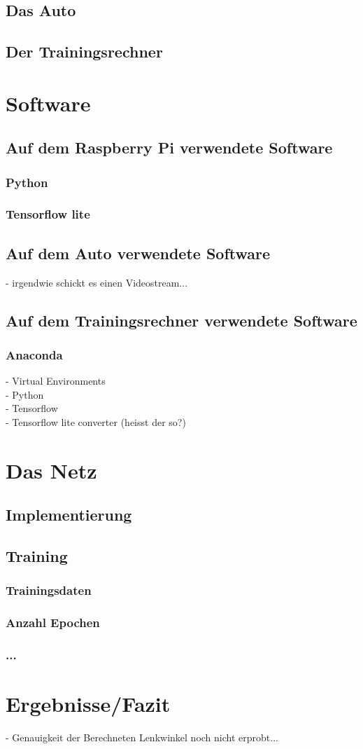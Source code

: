 \documentclass[a4paper, 12pt]{scrartcl}
\begin{document}
		
		\subsection{Das Auto}
		\subsection{Der Trainingsrechner}
	
	\section{Software}
		\subsection{Auf dem Raspberry Pi verwendete Software}
			\subsubsection{Python}
			\subsubsection{Tensorflow lite}
		\subsection{Auf dem Auto verwendete Software}
		- irgendwie schickt es einen Videostream...
		\subsection{Auf dem Trainingsrechner verwendete Software}
			\subsubsection{Anaconda}
			- Virtual Environments \\
			- Python \\
			- Tensorflow \\
			- Tensorflow lite converter (heisst der so?) \\
			
		\section{Das Netz}
			\subsection{Implementierung}
			\subsection{Training}
				\subsubsection{Trainingsdaten}
				\subsubsection{Anzahl Epochen}
				\subsubsection{...}
			
	\section{Ergebnisse/Fazit}
	- Genauigkeit der Berechneten Lenkwinkel noch nicht erprobt...
\end{document}
